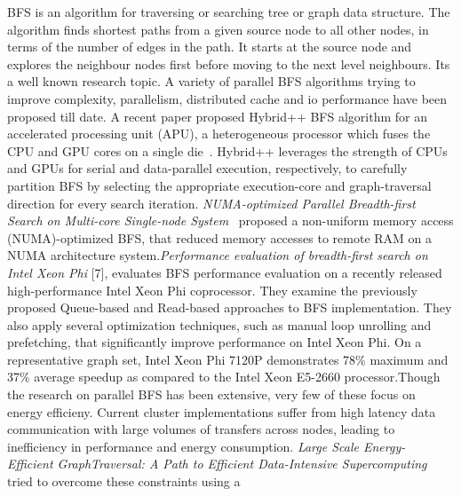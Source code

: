 BFS is an algorithm for traversing or searching tree or graph data
structure. The algorithm finds shortest paths from a given source node
to all other nodes, in terms of the number of edges in the path. It
starts at the source node and explores the neighbour nodes first
before moving to the next level neighbours.  Its a well known research
topic. A variety of parallel BFS algorithms trying to improve
complexity, parallelism, distributed cache and io performance have
been proposed till date.\newline
A recent paper proposed Hybrid++ BFS algorithm for an accelerated
processing unit (APU), a heterogeneous processor which fuses the CPU
and GPU cores on a single die~\cite{HYBRIS}. Hybrid++ leverages the
strength of CPUs and GPUs for serial and data-parallel execution,
respectively, to carefully partition BFS by selecting the appropriate
execution-core and graph-traversal direction for every search
iteration.\newline
\emph{NUMA-optimized Parallel Breadth-first Search on Multi-core
Single-node System}~\cite{NUMA-BFS} proposed a non-uniform memory
access (NUMA)-optimized BFS, that reduced memory accesses to remote
RAM on a NUMA architecture system.\newline \emph{Performance
evaluation of breadth-first search on Intel Xeon Phi} [7], evaluates
BFS performance evaluation on a recently released high-performance
Intel Xeon Phi coprocessor. They examine the previously proposed
Queue-based and Read-based approaches to BFS implementation. They also
apply several optimization techniques, such as manual loop unrolling
and prefetching, that significantly improve performance on Intel Xeon
Phi. On a representative graph set, Intel Xeon Phi 7120P demonstrates
78\% maximum and 37\% average speedup as compared to the Intel Xeon
E5-2660 processor.\newline Though the research on parallel BFS has
been extensive, very few of these focus on energy efficieny.\newline
Current cluster implementations suffer from high latency data
communication with large volumes of transfers across nodes, leading to
inefficiency in performance and energy consumption. \emph{Large Scale
Energy- Efficient GraphTraversal: A Path to Efficient Data-Intensive
Supercomputing}~\cite{INTEL-BFS} tried to overcome these constraints using a
